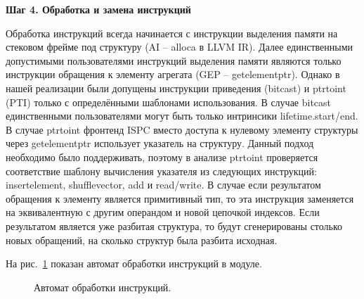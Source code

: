 \textbf{Шаг 4. Обработка и замена инструкций}

Обработка инструкций всегда начинается с инструкции выделения памяти на стековом фрейме под структуру (AI -- alloca в LLVM IR).
Далее единственными допустимыми пользователями инструкций выделения памяти являются только инструкции обращения к элементу агрегата (GEP -- getelementptr).
Однако в нашей реализации были допущены инструкции приведения (bitcast) и ptrtoint (PTI) только с определёнными шаблонами использования.
В случае bitcast единственными пользователями могут быть только интринсики lifetime.start/end.
В случае ptrtoint фронтенд ISPC вместо доступа к нулевому элементу структуры через getelementptr использует указатель на структуру.
Данный подход необходимо было поддерживать, поэтому в анализе ptrtoint проверяется соответствие шаблону вычисления указателя из следующих инструкций: insertelement, shufflevector, add и read/write.
В случае если результатом обращения к элементу является примитивный тип, то эта инструкция заменяется на эквивалентную с другим операндом и новой цепочкой индексов.
Если результатом является уже разбитая структура, то будут сгенерированы столько новых обращений, на сколько структур была разбита исходная.

На рис.~\ref{fig:inst_proc} показан автомат обработки инструкций в модуле.

\begin{figure}[ht]
    \centering
    \caption{Автомат обработки инструкций.}
    \label{fig:inst_proc}
\end{figure}